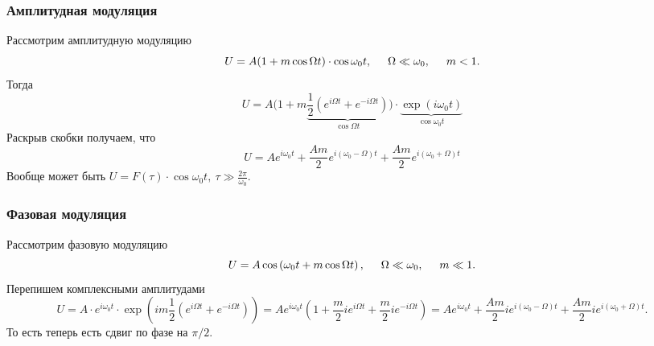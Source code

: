 \subsubsection*{Амплитудная модуляция}

Рассмотрим амплитудную модуляцию
\begin{equation*}
    U = A(1 + m \cos \Omega t) \cdot \cos \omega_0 t, \hspace{0.5cm} 
    \Omega \ll \omega_0, \hspace{0.5cm} m<1.
\end{equation*}
Тогда
\begin{equation*}
    U = A\bigg(
        1 + m \underbrace{
        \frac{1}{2} \left(
            e^{i\Omega t} + e^{-i\Omega t}
        \right)
        }_{\cos \Omega t}
    \bigg) \cdot 
    \underbrace{
    \exp\left(i \omega_0 t\right)
    }_{
    \cos \omega_0 t
    }
\end{equation*}
Раскрыв скобки получаем, что
\begin{equation*}
    U = A e^{i \omega_0 t} + \frac{Am}{2} e^{i \left(\omega_0-\Omega\right) t} + \frac{Am}{2} e^{i \left(\omega_0+\Omega\right) t}
\end{equation*}
Вообще может быть $U = F(\tau) \cdot \cos \omega_0 t, \ \tau \gg \frac{2\pi}{\omega_0}$. 

\subsubsection*{Фазовая модуляция}

Рассмотрим фазовую модуляцию
\begin{equation*}
    U = A \cos \left(
        \omega_0 t + m \cos \Omega t
    \right),
    \hspace{0.5cm} \Omega \ll \omega_0, \hspace{0.5cm} m \ll 1.
\end{equation*}
Перепишем комплексными амплитудами
\begin{equation*}
    U = A \cdot e^{i \omega_0 t} \cdot \exp\left(
        im \frac{1}{2} \left(
            e^{i \Omega t} + e^{-i\Omega t}
        \right)
    \right) = 
    A e^{i \omega_0 t}
    \left(
        1 + \frac{m}{2} i e^{i \Omega t} + \frac{m}{2} i e^{-i\Omega t}
    \right) = 
    A e^{i\omega_0 t} + \frac{Am}{2} i e^{i(\omega_0 - \Omega)t}
    + \frac{Am}{2} i e^{i(\omega_0 + \Omega)t}.
\end{equation*}
То есть теперь есть сдвиг по фазе на $\pi/2$. 


